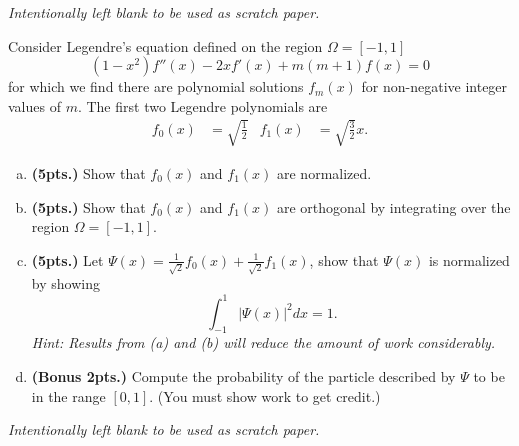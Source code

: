 \documentclass[12pt]{amsbook}
\begin{document}
\newpage
\emph{Intentionally left blank to be used as scratch paper.}\\


\newpage
\begin{problem}
Consider Legendre's equation defined on the region $\Omega=[-1,1]$
\[
(1-x^2)f''(x) -2xf'(x) +m(m+1) f(x) = 0
\]
for which we find there are polynomial solutions $f_m(x)$ for non-negative integer values of $m$. The first two Legendre polynomials are
\begin{align*}
    f_0(x)&=\sqrt{\frac{1}{2}} & f_1(x)&=\sqrt{\frac{3}{2}}x.
\end{align*}
\begin{enumerate}[(a)]
    \item \textbf{(5pts.)} Show that $f_0(x)$ and $f_1(x)$ are normalized.
    \vspace*{5cm}
    \item \textbf{(5pts.)} Show that $f_0(x)$ and $f_1(x)$ are orthogonal by integrating over the region $\Omega=[-1,1]$.
    \vspace*{4cm}
    \item \textbf{(5pts.)} Let $\Psi(x)=\frac{1}{\sqrt{2}}f_0(x) + \frac{1}{\sqrt{2}}f_1(x)$, show that $\Psi(x)$ is normalized by showing
    \[
    \int_{-1}^1 |\Psi(x)|^2dx = 1.
    \]
    \emph{Hint: Results from (a) and (b) will reduce the amount of work considerably.}
    \vspace*{4cm}
    \item \textbf{(Bonus 2pts.)} Compute the probability of the particle described by $\Psi$ to be in the range $[0,1]$. (You must show work to get credit.)
\end{enumerate}
\end{problem}

\newpage
\emph{Intentionally left blank to be used as scratch paper.}\\
\end{document}

